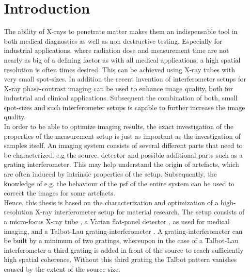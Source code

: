 \chapter{Introduction}\label{chap:intro}
The ability of X-rays to penetrate matter makes them an indispensable tool in both medical diagnostics as well as non destructive testing.
Especially for industrial applications, where radiation dose and measurement time are not nearly as big of a defining factor as with all medical applications, a high spatial resolution is often times desired. This can be achieved using X-ray tubes with very small spot-sizes.
In addition the recent invention of interferometer setups for X-ray phase-contrast imaging \citep{David2002} can be used to enhance image quality, both for industrial and clinical applications. Subsequent the combination of both, small spot-sizes and such interferometer setups is capable to further increase the image quality. \\

In order to be able to optimize imaging results, the exact investigation of the properties of the measurement setup is just as important as the investigation of samples itself. An imaging system consists of several different parts that need to be characterized, e.g the source, detector and possible additional parts such as a grating interferometer. This may help understand the origin of artefacts, which are often induced by intrinsic properties of the setup. Subsequently, the knowledge of e.g. the behaviour of the \gls{psf} of the entire system can be used to correct the images for some artefacts.\\ 

Hence, this thesis is based on the characterization and optimization of a high-resolution X-ray interferometer setup for material research. The setup consists of a micro-focus X-ray tube \citep{DatasheetX}, a Varian flat-panel detector \citep{Paxscan}, as used for medical imaging, and a Talbot-Lau grating-interferometer \citep{Pfeiffer2006}. A grating-interferometer can be built by a minimum of two gratings, whereupon in the case of a Talbot-Lau interferometer a third grating is added in front of the source to reach sufficiently high spatial coherence. Without this third grating the Talbot pattern vanishes caused by the extent of the source size.\\ 

